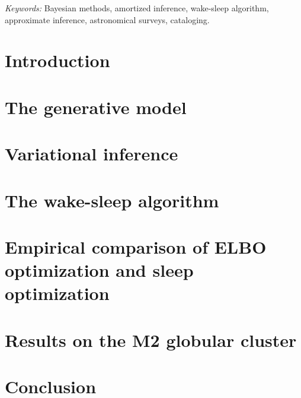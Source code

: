 \documentclass[12pt]{article}
\begin{document}
\noindent%
{\it Keywords:}  Bayesian methods, amortized inference, wake-sleep algorithm, approximate inference, astronomical surveys, cataloging. 



\section{Introduction}
\label{sec:intro}


\section{The generative model}
\label{sec:gen_model}


\section{Variational inference}
\label{sec:var_inference}


\section{The wake-sleep algorithm}
\label{sec:wake_sleep}



% 

\section{Empirical comparison of ELBO optimization and sleep optimization}

% 

\section{Results on the M2 globular cluster}


\section{Conclusion}
\label{sec:discussion}

\end{document}
